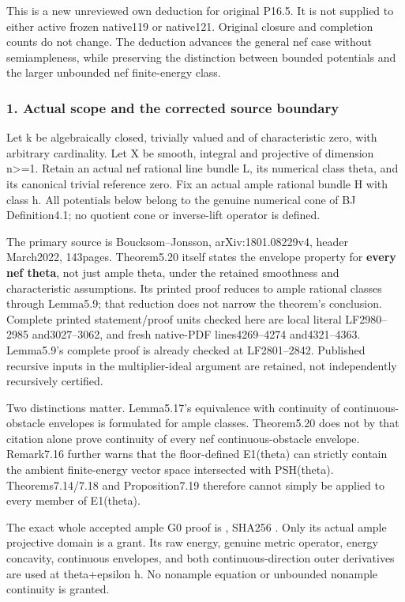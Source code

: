 \documentclass[
]{article}
\begin{document}
This is a new unreviewed own deduction for original P16.5. It is not
supplied to either active frozen native119 or native121. Original
closure and completion counts do not change. The deduction advances the
general nef case without semiampleness, while preserving the distinction
between bounded potentials and the larger unbounded nef finite-energy
class.

\subsubsection{1. Actual scope and the corrected source
boundary}\label{actual-scope-and-the-corrected-source-boundary}

Let k be algebraically closed, trivially valued and of characteristic
zero, with arbitrary cardinality. Let X be smooth, integral and
projective of dimension n\textgreater=1. Retain an actual nef rational
line bundle L, its numerical class theta, and its canonical trivial
reference zero. Fix an actual ample rational bundle H with class h. All
potentials below belong to the genuine numerical cone of BJ
Definition4.1; no quotient cone or inverse-lift operator is defined.

The primary source is Boucksom--Jonsson, arXiv:1801.08229v4, header
March2022, 143pages. Theorem5.20 itself states the envelope property for
\textbf{every nef theta}, not just ample theta, under the retained
smoothness and characteristic assumptions. Its printed proof reduces to
ample rational classes through Lemma5.9; that reduction does not narrow
the theorem's conclusion. Complete printed statement/proof units checked
here are local literal LF2980--2985 and3027--3062, and fresh native-PDF
lines4269--4274 and4321--4363. Lemma5.9's complete proof is already
checked at LF2801--2842. Published recursive inputs in the
multiplier-ideal argument are retained, not independently recursively
certified.

Two distinctions matter. Lemma5.17's equivalence with continuity of
continuous-obstacle envelopes is formulated for ample classes.
Theorem5.20 does not by that citation alone prove continuity of every
nef continuous-obstacle envelope. Remark7.16 further warns that the
floor-defined E1(theta) can strictly contain the ambient finite-energy
vector space intersected with PSH(theta). Theorems7.14/7.18 and
Proposition7.19 therefore cannot simply be applied to every member of
E1(theta).

The exact whole accepted ample G0 proof is
,
SHA256
.
Only its actual ample projective domain is a grant. Its raw energy,
genuine metric operator, energy concavity, continuous envelopes, and
both continuous-direction outer derivatives are used at theta+epsilon h.
No nonample equation or unbounded nonample continuity is granted.
\end{document}
